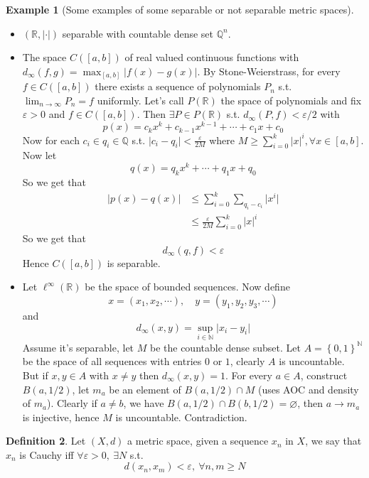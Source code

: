 \documentclass[11pt,a4paper]{article}
\theoremstyle{definition}
\newtheorem{definition}{Definition}[section]
\newtheorem{example}[definition]{Example}
\theoremstyle{plain}
\theoremstyle{remark}
\newcommand{\R}{\mathbb{R}}
\newcommand{\N}{\mathbb{N}}
\newcommand{\Q}{\mathbb{Q}}
\renewcommand{\set}[1]{\left\{ #1 \right\}}
\newcommand{\abs}[1]{\lvert #1 \rvert}
\newcommand{\1}{\mathbbm{1}}
\begin{document}
\begin{example}[Some examples of some separable or not separable metric spaces]
    \mbox{}\\
    \begin{itemize}
        \item $(\R, \abs{\cdot})$ separable with countable dense set $\Q^n$.
        
        \item The space $C([a,b])$ of real valued continuous functions with $d_\infty(f, g) = \max_{[a, b]} \abs{f(x) - g(x)}$. By Stone-Weierstrass, for every $f \in C([a,b])$ there exists a sequence of polynomials 
        $P_n$ s.t. $\lim_{n \to \infty} P_n = f$ uniformly. Let's call $P(\R)$ the space of polynomials and fix $\varepsilon > 0$ and $f \in C([a,b])$. Then $\exists P \in P(\R)$ s.t. 
        $d_\infty (P, f) < \varepsilon/2$ with 
        $$p(x) = c_k x^k + c_{k-1} x^{k-1} + \cdots + c_1 x + c_0$$
        Now for each $c_i \in q_i \in \Q$ s.t. $\abs{c_i - q_i} < \frac{\varepsilon}{2M}$ where $M \ge \sum_{i=0}^k \abs{x}^i, \forall x \in [a,b]$. Now let 
        $$q(x) = q_k x^k + \cdots + q_1 x + q_0$$
        So we get that 
        \begin{align*}
            \abs{p(x) - q(x)} &\le \sum_{i=0}^k \sum_{q_i - c_i} \abs{x^i} \\ 
            &\le \frac{\varepsilon}{2M} \sum_{i=0}^k \abs{x}^i
        \end{align*}
        So we get that 
        $$d_\infty(q, f) < \varepsilon$$
        Hence $C([a, b])$ is separable.

        \item Let $\ell^\infty (\R)$ be the space of bounded sequences. Now define 
        $$x = (x_1, x_2, \cdots), \quad y = (y_1, y_2, y_3, \cdots)$$ 
        and 
        $$d_\infty (x,y) = \sup_{i \in \N} \abs{x_i - y_i}$$
        Assume it's separable, let $M$ be the countable dense subset. Let $A = \set{0,1}^\N$ be the space of all sequences with entries $0$ or $1$, clearly $A$ is uncountable. But if $x, y \in A$  with $x \ne y$ then 
        $d_\infty (x, y) = 1$. For every $a \in A$, construct $B(a, 1/2)$, let $m_a$ be an element of $B(a, 1/2) \cap M$ (uses AOC and density of $m_a$). Clearly if $a \ne b$, we have 
        $B(a, 1/2) \cap B(b, 1/2) = \varnothing$, then $a \to m_a$ is injective, hence $M$ is uncountable. Contradiction.
    \end{itemize}    
\end{example}

\begin{definition}
    Let $(X, d)$ a metric space, given a sequence $x_n$ in $X$, we say that $x_n$ is Cauchy iff $\forall \varepsilon > 0, \ \exists N$ s.t. 
    $$d(x_n, x_m) < \varepsilon, \ \forall n, m \ge N$$  
\end{definition}
\end{document}
